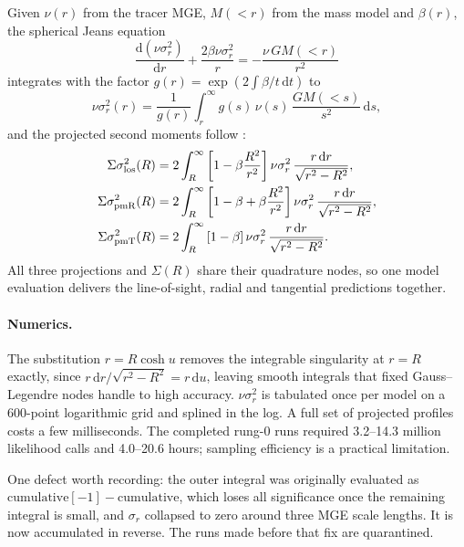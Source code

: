 \documentclass[11pt,a4paper]{article}
\begin{document}
Given $\nu(r)$ from the tracer MGE, $M(<r)$ from the mass model and $\beta(r)$, the spherical
Jeans equation
\begin{equation}
\frac{\mathrm{d}(\nu\sigma_r^2)}{\mathrm{d}r} + \frac{2\beta\nu\sigma_r^2}{r}
= -\frac{\nu\,G M(<r)}{r^2}
\end{equation}
integrates with the factor $g(r)=\exp\left(2\int\beta/t\,\mathrm{d}t\right)$ to
\begin{equation}
\nu\sigma_r^2(r) = \frac{1}{g(r)}\int_r^\infty g(s)\,\nu(s)\,\frac{G M(<s)}{s^2}\,\mathrm{d}s ,
\end{equation}
and the projected second moments follow \citep{binneymamon1982}:
\begin{align}
\Sigma\sigma_{\rm los}^2(R) &= 2\int_R^\infty \left[1-\beta\frac{R^2}{r^2}\right]
   \nu\sigma_r^2\,\frac{r\,\mathrm{d}r}{\sqrt{r^2-R^2}},\\
\Sigma\sigma_{\rm pmR}^2(R) &= 2\int_R^\infty \left[1-\beta+\beta\frac{R^2}{r^2}\right]
   \nu\sigma_r^2\,\frac{r\,\mathrm{d}r}{\sqrt{r^2-R^2}},\\
\Sigma\sigma_{\rm pmT}^2(R) &= 2\int_R^\infty \left[1-\beta\right]
   \nu\sigma_r^2\,\frac{r\,\mathrm{d}r}{\sqrt{r^2-R^2}} .
\end{align}
All three projections and $\Sigma(R)$ share their quadrature nodes, so one model evaluation
delivers the line-of-sight, radial and tangential predictions together.

\paragraph{Numerics.} The substitution $r=R\cosh u$ removes the integrable singularity at
$r=R$ exactly, since $r\,\mathrm{d}r/\sqrt{r^2-R^2}=r\,\mathrm{d}u$, leaving smooth integrals
that fixed Gauss--Legendre nodes handle to high accuracy. $\nu\sigma_r^2$ is tabulated once per
model on a 600-point logarithmic grid and splined in the log. A full set of projected profiles
costs a few milliseconds. The completed rung-0 runs required 3.2--14.3 million
likelihood calls and 4.0--20.6 hours; sampling efficiency is a practical limitation.

One defect worth recording: the outer integral was originally evaluated as
$\mathrm{cumulative}[-1]-\mathrm{cumulative}$, which loses all significance once the remaining
integral is small, and $\sigma_r$ collapsed to zero around three MGE scale lengths. It is now
accumulated in reverse. The runs made before that fix are quarantined.
\end{document}
